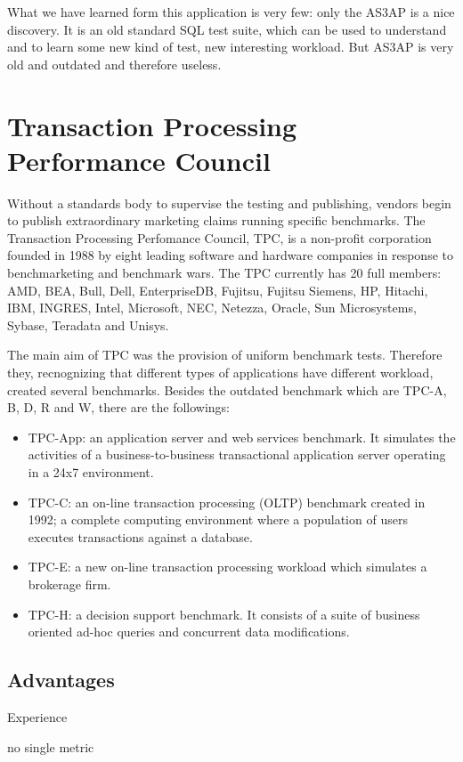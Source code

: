 What we have learned form this application is very few: only the AS3AP is a nice discovery. It is an old standard SQL test suite, which can be used to understand and to learn some new kind of test, new interesting workload. But AS3AP is very old and outdated and therefore useless.
	
	\section{Transaction Processing Performance Council}
Without a standards body to supervise the testing and publishing, vendors begin to publish extraordinary marketing claims running specific benchmarks. The Transaction Processing Perfomance Council, TPC, is a non-profit corporation founded in 1988 by eight leading software and hardware companies in response to benchmarketing and benchmark wars. The TPC currently has 20 full members: AMD, BEA, Bull, Dell, EnterpriseDB, Fujitsu, Fujitsu Siemens, HP, Hitachi, IBM, INGRES, Intel, Microsoft, NEC, Netezza, Oracle, Sun Microsystems, Sybase, Teradata and Unisys.

The main aim of TPC was the provision of uniform benchmark tests. Therefore they, recnognizing that different types of applications have different workload, created several benchmarks. Besides the outdated benchmark which are TPC-A, B, D, R and W, there are the followings: 
\begin{itemize}
	\item TPC-App: an application server and web services benchmark. It simulates the activities of a business-to-business transactional application server operating in a 24x7 environment.
	\item TPC-C: an on-line transaction processing (OLTP) benchmark created in 1992; a complete computing environment where a population of users executes transactions against a database.
	\item TPC-E: a new on-line transaction processing workload which simulates a brokerage firm.
	\item TPC-H: a decision support benchmark. It consists of a suite of business oriented ad-hoc queries and concurrent data modifications.
\end{itemize}

		\subsection{Advantages}
Experience

no single metric

